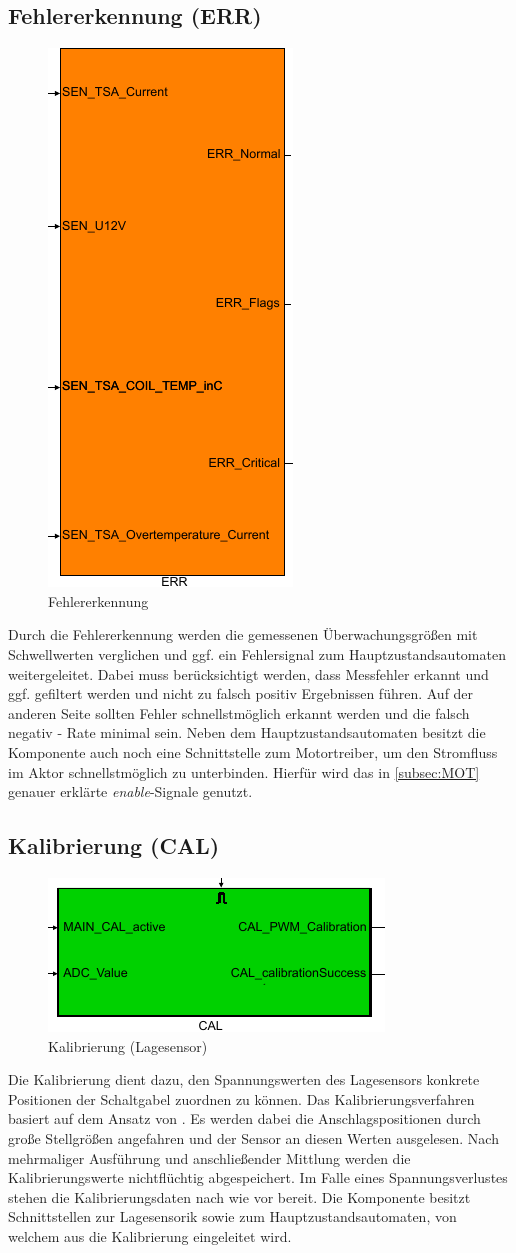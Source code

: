 \subsection{Fehlererkennung (ERR)}
\begin{figure}[H]%
\centering
\includegraphics[width=0.2\columnwidth]{./Bilder/fig_err}%
\caption{Fehlererkennung}%
\label{fig_err}%
\end{figure}
Durch die Fehlererkennung werden die gemessenen Überwachungsgrößen mit Schwellwerten verglichen und ggf. ein Fehlersignal zum Hauptzustandsautomaten weitergeleitet. Dabei muss berücksichtigt werden, dass Messfehler erkannt und ggf. gefiltert werden und nicht zu falsch positiv Ergebnissen führen. Auf der anderen Seite sollten Fehler schnellstmöglich erkannt werden und die falsch negativ - Rate minimal sein. Neben dem Hauptzustandsautomaten besitzt die Komponente auch noch eine Schnittstelle zum Motortreiber, um den Stromfluss im Aktor schnellstmöglich zu unterbinden. Hierfür wird das in \autoref{subsec:MOT} genauer erklärte \textit{enable}-Signale genutzt.

\subsection{Kalibrierung (CAL)}

\begin{figure}[H]%
\centering
\includegraphics[width=0.3\columnwidth]{./Bilder/fig_cal}%
\caption{Kalibrierung (Lagesensor)}%
\label{fig_cal}%
\end{figure}

Die Kalibrierung dient dazu, den Spannungswerten des Lagesensors konkrete Positionen der Schaltgabel zuordnen zu können. Das Kalibrierungsverfahren basiert auf dem Ansatz von \cite{vADP}. Es werden dabei die Anschlagspositionen durch große Stellgrößen angefahren und der Sensor an diesen Werten ausgelesen. Nach mehrmaliger Ausführung und anschließender Mittlung werden die Kalibrierungswerte nichtflüchtig abgespeichert. Im Falle eines Spannungsverlustes stehen die Kalibrierungsdaten nach wie vor bereit. Die Komponente besitzt Schnittstellen zur Lagesensorik sowie zum Hauptzustandsautomaten, von welchem aus die Kalibrierung eingeleitet wird.

